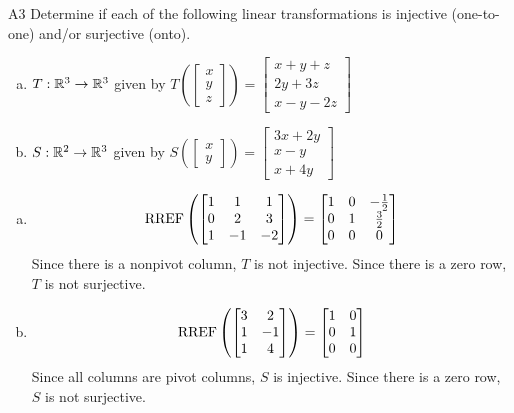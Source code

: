 \documentclass{sbgLAquiz}
\begin{document}
\begin{problem}{A3}
Determine if each of the following linear transformations is injective (one-to-one) and/or surjective (onto).
\begin{enumerate}[(a)]
\item $T: \mathbb{R}^3 \rightarrow \mathbb{R}^3$ given by $T\left(\begin{bmatrix} x \\ y \\ z  \end{bmatrix} \right) = \begin{bmatrix} x+y+z \\ 2y+3z \\ x-y-2z \end{bmatrix} $
\item $S: \mathbb{R}^2 \rightarrow \mathbb{R}^3$ given by $S\left(\begin{bmatrix} x \\ y  \end{bmatrix} \right) = \begin{bmatrix} 3x+2y \\ x-y \\ x+4y \end{bmatrix} $
\end{enumerate}
\end{problem}
\begin{solution}
\begin{enumerate}[(a)]
\item $$\operatorname{RREF}\left( \begin{bmatrix} 1 &  1 & 1 \\ 0  & 2 & 3 \\ 1  & -1 & -2 \end{bmatrix} \right) = \begin{bmatrix} 1 &  0 & -\frac{1}{2} \\ 0  & 1 & \frac{3}{2} \\ 0& 0 & 0  \end{bmatrix}$$
Since there is a nonpivot column, $T$ is not injective.  Since there is a zero row, $T$ is not surjective.
\item $$\operatorname{RREF} \left( \begin{bmatrix} 3 & 2 \\ 1 & -1 \\ 1 & 4 \end{bmatrix} \right) = \begin{bmatrix} 1 & 0 \\ 0 & 1 \\ 0 & 0 \end{bmatrix}$$
Since all columns are pivot columns, $S$ is injective.  Since there is a zero row, $S$ is not surjective.
\end{enumerate}
\end{solution}
\end{document}
